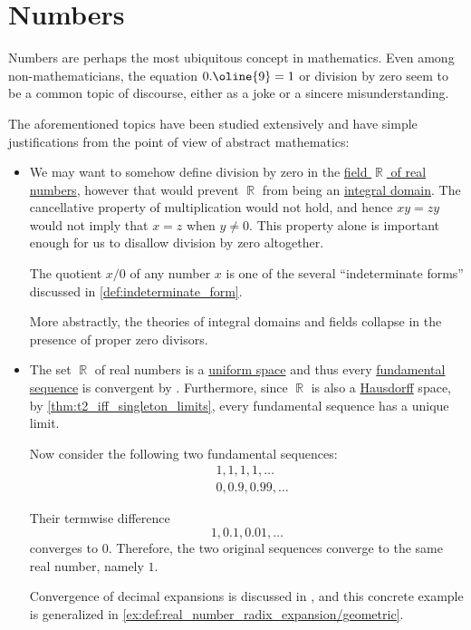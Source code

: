 \chapter{Numbers}\label{ch:numbers}

Numbers are perhaps the most ubiquitous concept in mathematics. Even among non-mathematicians, the equation \( 0.\oline{9} = 1 \) or division by zero seem to be a common topic of discourse, either as a joke or a sincere misunderstanding.

The aforementioned topics have been studied extensively and have simple justifications from the point of view of abstract mathematics:
\begin{itemize}
  \item We may want to somehow define division by zero in the \hyperref[def:real_numbers]{field \( \BbbR \) of real numbers}, however that would prevent \( \BbbR \) from being an \hyperref[def:integral_domain]{integral domain}. The cancellative property of multiplication would not hold, and hence \( xy = zy \) would not imply that \( x = z \) when \( y \neq 0 \). This property alone is important enough for us to disallow division by zero altogether.

  The quotient \( x / 0 \) of any number \( x \) is one of the several \enquote{indeterminate forms} discussed in \cref{def:indeterminate_form}.

  More abstractly, the theories of integral domains and fields collapse in the presence of proper zero divisors.

  \item The set \( \BbbR \) of real numbers is a \hyperref[def:uniform_space]{uniform space} and thus every \hyperref[def:fundamental_net]{fundamental sequence} is convergent by . Furthermore, since \( \BbbR \) is also a \hyperref[def:separation_axioms/T2]{Hausdorff} space, by \cref{thm:t2_iff_singleton_limits}, every fundamental sequence has a unique limit.

  Now consider the following two fundamental sequences:
  \begin{align*}
    &1, 1, 1, 1, \ldots \\
    &0, 0.9, 0.99, \ldots
  \end{align*}

  Their termwise difference
  \begin{equation*}
    1, 0.1, 0.01, \ldots
  \end{equation*}
  converges to \( 0 \). Therefore, the two original sequences converge to the same real number, namely \( 1 \).

  Convergence of decimal expansions is discussed in , and this concrete example is generalized in \cref{ex:def:real_number_radix_expansion/geometric}.
\end{itemize}

